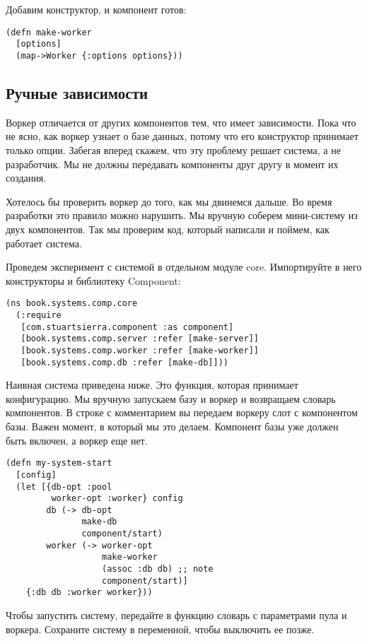 Добавим конструктор, и компонент готов:

\begin{verbatim}
(defn make-worker
  [options]
  (map->Worker {:options options}))
\end{verbatim}

\subsection{Ручные зависимости}

Воркер отличается от других компонентов тем, что имеет зависимости. Пока что не
ясно, как воркер узнает о базе данных, потому что его конструктор принимает
только опции. Забегая вперед скажем, что эту проблему решает система, а не
разработчик. Мы не должны передавать компоненты друг другу в момент их создания.

Хотелось бы проверить воркер до того, как мы двинемся дальше. Во время
разработки это правило можно нарушить. Мы вручную соберем мини-систему из двух
компонентов. Так мы проверим код, который написали и поймем, как работает
система.

Проведем эксперимент с системой в отдельном модуле core. Импортируйте в него
конструкторы и библиотеку Component:

\begin{verbatim}
(ns book.systems.comp.core
  (:require
   [com.stuartsierra.component :as component]
   [book.systems.comp.server :refer [make-server]]
   [book.systems.comp.worker :refer [make-worker]]
   [book.systems.comp.db :refer [make-db]]))
\end{verbatim}

Наивная система приведена ниже. Это функция, которая принимает конфигурацию. Мы
вручную запускаем базу и воркер и возвращаем словарь компонентов. В строке с
комментарием вы передаем воркеру слот с компонентом базы. Важен момент, в
который мы это делаем. Компонент базы уже должен быть включен, а воркер еще нет.

\begin{verbatim}
(defn my-system-start
  [config]
  (let [{db-opt :pool
         worker-opt :worker} config
        db (-> db-opt
               make-db
               component/start)
        worker (-> worker-opt
                   make-worker
                   (assoc :db db) ;; note
                   component/start)]
    {:db db :worker worker}))
\end{verbatim}

Чтобы запустить систему, передайте в функцию словарь с параметрами пула и
воркера. Сохраните систему в переменной, чтобы выключить ее позже.

